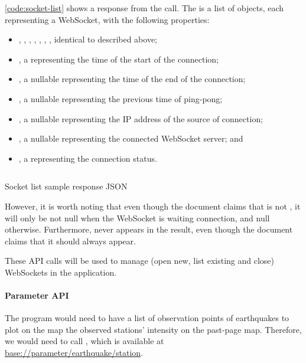 \autoref{code:socket-list} shows a response from the call. The  is a list of objects, each representing a WebSocket, with the following properties:
\begin{itemize}
    \item {}, , , , , , , identical to described above;
    \item {}, a  representing the time of the start of the connection;
    \item {}, a nullable  representing the time of the end of the connection;
    \item {}, a nullable  representing the previous time of ping-pong;
    \item {}, a nullable  representing the IP address of the source of connection;
    \item {}, a nullable  representing the connected WebSocket server; and
    \item {}, a  representing the connection status.
\end{itemize}

\begin{listing}[htp]
    \inputminted{json}{code/SocketList.json}
    \caption{Socket list sample response JSON}
    \label{code:socket-list}
\end{listing}

However, it is worth noting that even though the document claims that  is not , it will only be not null when the WebSocket is waiting connection, and null otherwise. Furthermore,  never appears in the result, even though the document claims that it should always appear.

These API calls will be used to manage (open new, list existing and close) WebSockets in the application.

\paragraph{Parameter API}

The program would need to have a list of observation points of earthquakes to plot on the map the observed stations' intensity on the past-page map. Therefore, we would need to call , which is available at \url{base://parameter/earthquake/station}.

